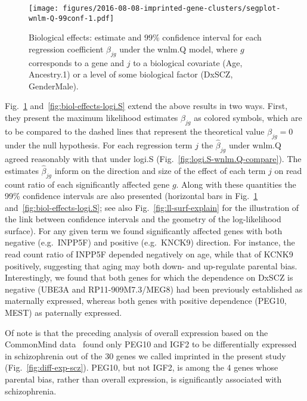 \documentclass[letterpaper]{article}
\begin{document}
\begin{figure}
\begin{center}
\texttt{[image: figures/2016-08-08-imprinted-gene-clusters/segplot-wnlm-Q-99conf-1.pdf]}
\end{center}
\caption{Biological effects: estimate and $99\%$ confidence interval for each
regression coefficient \(\beta_{jg}\) under the wnlm.Q model, where \(g\)
corresponds to a gene and \(j\) to a biological covariate (Age, Ancestry.1) or
a level of some biological factor (DxSCZ, GenderMale).}
\label{fig:biol-effects-wnlm.Q}
\end{figure}

Fig.~\ref{fig:biol-effects-wnlm.Q} and~\ref{fig:biol-effects-logi.S} extend
the above results in two ways. First, they present the maximum likelihood
estimates \(\hat\beta_{jg}\) as colored symbols, which are to be compared to
the dashed lines that represent the theoretical value \(\beta_{jg} = 0\) under
the null hypothesis.  For each regression term \(j\) the \(\hat\beta_{jg}\)
under wnlm.Q agreed reasonably with that under logi.S
(Fig.~\ref{fig:logi.S-wnlm.Q-compare}).  The estimates \(\hat\beta_{jg}\)
inform on the direction and size of the effect of each term \(j\) on read
count ratio of each significantly affected gene \(g\).  Along with these
quantities the 99\% confidence intervals are also presented (horizontal bars
in Fig.~\ref{fig:biol-effects-wnlm.Q} and~\ref{fig:biol-effects-logi.S}; see
also Fig.~\ref{fig:ll-surf-explain} for the illustration of the link between
confidence intervals and the geometry of the log-likelihood surface). For any
given term we found significantly affected genes with both negative
(e.g.~INPP5F) and positive (e.g.~KNCK9) direction.  For instance, the read
count ratio of INPP5F depended negatively on age, while that of KCNK9
positively, suggesting that aging may both down- and up-regulate parental
bias. Interestingly, we found that both genes for which the dependence on
DxSCZ is negative (UBE3A and RP11-909M7.3/MEG8) had been previously
established as maternally expressed, whereas both genes with positive
dependence (PEG10, MEST) as paternally expressed.

Of note is that the preceding analysis of overall expression based on the
CommonMind data~\cite{Fromer2016a} found only PEG10 and IGF2 to be
differentially expressed in schizophrenia out of the 30 genes we called
imprinted in the present study (Fig.~\ref{fig:diff-exp-scz}). PEG10, but not
IGF2, is among the 4 genes whose parental bias, rather than overall
expression, is significantly associated with schizophrenia.
\end{document}
